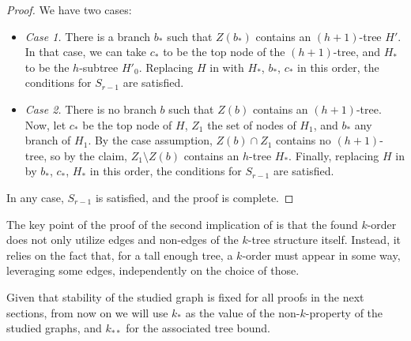 \begin{theorem}
\begin{proof}
            We have two cases:
            \begin{itemize}
                \item \emph{Case 1.} There is a branch $b_*$ such that $Z(b_*)$ contains an $(h+1)$-tree $H'$.
                    In that case, we can take $c_*$ to be the top node of the $(h+1)$-tree, and $H_*$ to be the
                    $h$-subtree $H'_0$.
                    Replacing $H$ in  with $H_*$, $b_*$, $c_*$ in this order, the
                    conditions for $S_{r-1}$ are satisfied.
                \item \emph{Case 2.} There is no branch $b$ such that $Z(b)$ contains an $(h+1)$-tree.
                    Now, let $c_*$ be the top node of $H$, $Z_1$ the set of nodes of $H_1$, and
                    $b_*$ any branch of $H_1$.
                    By the case assumption, $Z(b) \cap Z_1$ contains no $(h+1)$-tree, so by the claim,
                    $Z_1 \setminus Z(b)$ contains an $h$-tree $H_*$.
                    Finally, replacing $H$ in  by $b_*$, $c_*$, $H_*$ in this order, the
                    conditions for $S_{r-1}$ are satisfied.
            \end{itemize}
            In any case, $S_{r-1}$ is satisfied, and the proof is complete.
        \end{proof}
    \end{theorem}

    \begin{remark}
        The key point of the proof of the second implication of  is that the found $k$-order
        does not only utilize edges and non-edges of the $k$-tree structure itself.
        Instead, it relies on the fact that, for a tall enough tree, a $k$-order must appear in some way, leveraging
        some  edges, independently on the choice of those.
    \end{remark}

    Given that stability of the studied graph is fixed for all proofs in the next sections, from now on we will use
    $k_*$ as the value of the non-$k$-property of the studied graphs, and $k_{**}$ for the associated tree bound.